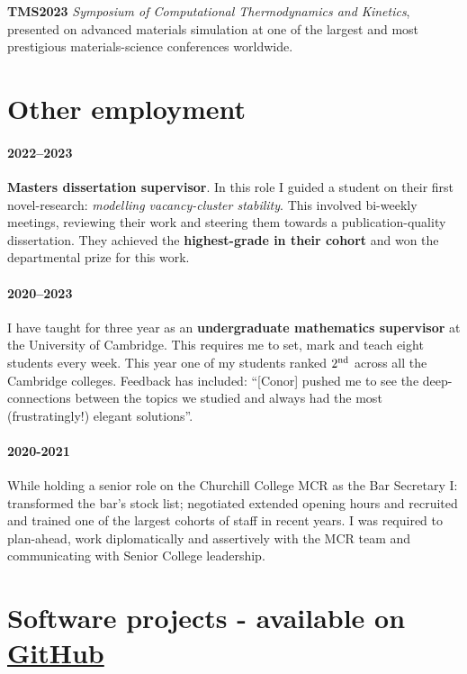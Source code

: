 \documentclass[11pt]{article}
\begin{document}
\textbf{TMS2023} \emph{Symposium of Computational Thermodynamics and Kinetics}, presented on advanced materials simulation at one of the largest and most prestigious materials-science conferences worldwide.



\section*{Other employment}

\paragraph*{2022--2023} \textbf{Masters dissertation supervisor}. In this role I guided a student on their first novel-research: \emph{modelling vacancy-cluster stability}. This involved bi-weekly meetings, reviewing their work and steering them towards a publication-quality dissertation. They achieved the \textbf{highest-grade in their cohort} and won the departmental prize for this work.

\paragraph*{2020--2023}

I have taught for three year as an \textbf{undergraduate mathematics supervisor} at the University of Cambridge. This requires me to set, mark and teach eight students every week. This year one of my students ranked $2\textsuperscript{nd}$ across all the Cambridge colleges. Feedback has included: ``[Conor] pushed me to see the deep-connections between the topics we studied and always had the most (frustratingly!) elegant solutions''. 

\paragraph*{2020-2021} While holding a senior role on the Churchill College MCR as the Bar Secretary I: transformed the bar's stock list; negotiated extended opening hours and recruited and trained one of the largest cohorts of staff in recent years. I was required to plan-ahead, work diplomatically and assertively with the MCR team and communicating with Senior College leadership.

\section*{Software projects - available on \href{https://github.com/ConorWilliams}{ GitHub \faGithub}}
\end{document}
